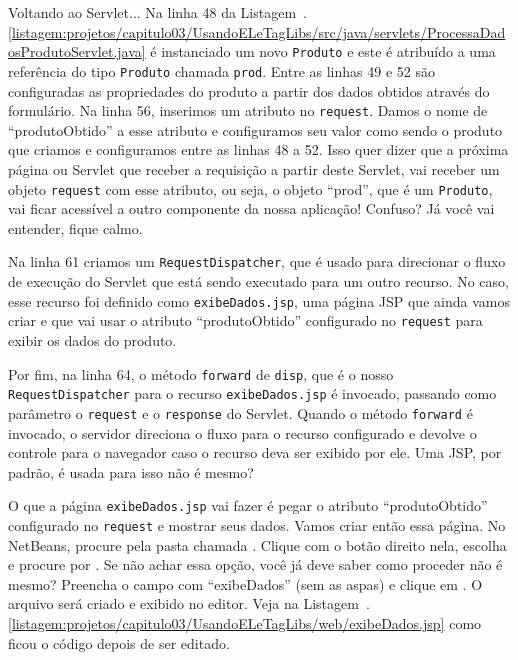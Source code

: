 Voltando ao Servlet... Na linha 48 da Listagem~\thechapter.\ref{listagem:projetos/capitulo03/UsandoELeTagLibs/src/java/servlets/ProcessaDadosProdutoServlet.java} é instanciado um novo \texttt{Produto} e este é atribuído a uma referência do tipo \texttt{Produto} chamada \texttt{prod}. Entre as linhas 49 e 52 são configuradas as propriedades do produto a partir dos dados obtidos através do formulário. Na linha 56, inserimos um atributo no \texttt{request}. Damos o nome de ``produtoObtido'' a esse atributo e configuramos seu valor como sendo o produto que criamos e configuramos entre as linhas 48 a 52. Isso quer dizer que a próxima página ou Servlet que receber a requisição a partir deste Servlet, vai receber um objeto \texttt{request} com esse atributo, ou seja, o objeto ``prod'', que é um \texttt{Produto}, vai ficar acessível a outro componente da nossa aplicação! Confuso? Já você vai entender, fique calmo.

Na linha 61 criamos um \texttt{RequestDispatcher}, que é usado para direcionar o fluxo de execução do Servlet que está sendo executado para um outro recurso. No caso, esse recurso foi definido como \texttt{exibeDados.jsp}, uma página JSP que ainda vamos criar e que vai usar o atributo ``produtoObtido'' configurado no \texttt{request} para exibir os dados do produto.

Por fim, na linha 64, o método \texttt{forward} de \texttt{disp}, que é o nosso \texttt{RequestDispatcher} para o recurso \texttt{exibeDados.jsp} é invocado, passando como parâmetro o \texttt{request} e o \texttt{response} do Servlet. Quando o método \texttt{forward} é invocado, o servidor direciona o fluxo para o recurso configurado e devolve o controle para o navegador caso o recurso deva ser exibido por ele. Uma JSP, por padrão, é usada para isso não é mesmo?

O que a página \texttt{exibeDados.jsp} vai fazer é pegar o atributo ``produtoObtido'' configurado no \texttt{request} e mostrar seus dados. Vamos criar então essa página. No NetBeans, procure pela pasta chamada . Clique com o botão direito nela, escolha  e procure por . Se não achar essa opção, você já deve saber como proceder não é mesmo? Preencha o campo  com ``exibeDados'' (sem as aspas) e clique em . O arquivo será criado e exibido no editor. Veja na Listagem~\thechapter.\ref{listagem:projetos/capitulo03/UsandoELeTagLibs/web/exibeDados.jsp} como ficou o código depois de ser editado.

